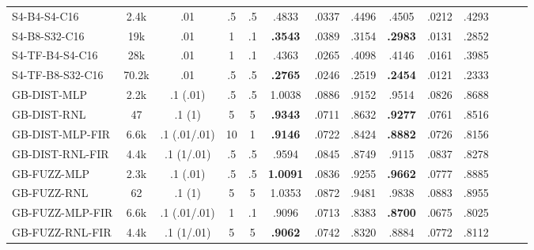 \begin{table*}[h]
\begin{tabular}{lccccccccccccc}
        \midrule
        S4-B4-S4-C16              
            & 2.4k & .01 & .5 & .5 & .4833 & .0337 & .4496 & .4505 & .0212 & .4293 \\
        S4-B8-S32-C16               
            & 19k & .01 & 1 & .1 & \textbf{.3543} & .0389 & .3154 & \textbf{.2983} & .0131 & .2852 \\
        \midrule
        S4-TF-B4-S4-C16              
            & 28k & .01 & 1 & .1 & .4363 & .0265 & .4098 & .4146 & .0161 & .3985 \\
        S4-TF-B8-S32-C16               
            & 70.2k & .01 & .5 & .5 & \textbf{.2765} & .0246 & .2519 & \textbf{.2454} & .0121 & .2333 \\
        \midrule
        GB-DIST-MLP             
            & 2.2k & .1 (.01) & .5 & .5 & 1.0038 & .0886 & .9152 & .9514 & .0826 & .8688 \\
        GB-DIST-RNL             
            & 47 & .1 (1) & 5 & 5 & \textbf{.9343} & .0711 & .8632 & \textbf{.9277} & .0761 & .8516 \\
        \midrule
        GB-DIST-MLP-FIR
            & 6.6k & .1 (.01/.01) & 10 & 1 & \textbf{.9146} & .0722 & .8424 & \textbf{.8882} & .0726 & .8156 \\
        GB-DIST-RNL-FIR         
            & 4.4k & .1 (1/.01) & .5 & .5 & .9594 & .0845 & .8749 & .9115 & .0837 & .8278 \\
        \midrule
        GB-FUZZ-MLP             
            & 2.3k & .1 (.01) & .5 & .5 & \textbf{1.0091} & .0836 & .9255 & \textbf{.9662} & .0777 & .8885 \\
        GB-FUZZ-RNL             
            & 62 & .1 (1) & 5 & 5 & 1.0353 & .0872 & .9481 & .9838 & .0883 & .8955 \\
        \midrule
        GB-FUZZ-MLP-FIR
            & 6.6k & .1 (.01/.01) & 1 & .1 & .9096 & .0713 & .8383 & \textbf{.8700} & .0675 & .8025 \\
        GB-FUZZ-RNL-FIR         
            & 4.4k & .1 (1/.01) & 5 & 5 & \textbf{.9062} & .0742 & .8320 & .8884 & .0772 & .8112 \\
        \bottomrule 
    \end{tabular}
    \label{tab:other_fx}
\end{table*}